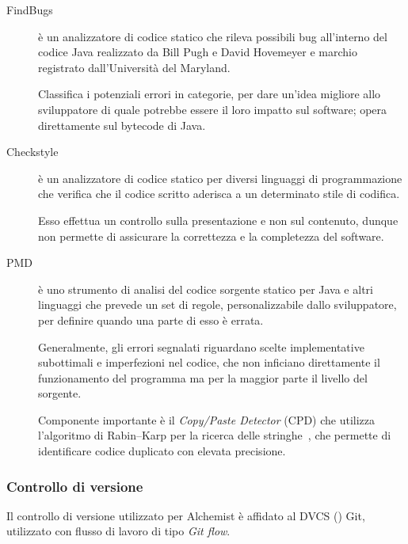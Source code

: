                \begin{description}
                    \item[FindBugs\footnotemark] è un analizzatore di codice statico  che rileva possibili bug all’interno del codice Java realizzato da Bill Pugh e David Hovemeyer e marchio registrato dall'Università del Maryland.

                    Classifica i potenziali errori in categorie, per dare un'idea migliore allo sviluppatore di quale potrebbe essere il loro impatto sul software; opera direttamente sul bytecode di Java.

                    \item[Checkstyle\footnotemark] è un analizzatore di codice statico  per diversi linguaggi di programmazione che verifica che il codice scritto aderisca a un determinato stile di codifica.

                    Esso effettua un controllo sulla presentazione e non sul contenuto, dunque non permette di assicurare la correttezza e la completezza del software.

                    \item[PMD\footnotemark] è uno strumento di analisi del codice sorgente statico per Java e altri linguaggi che prevede un set di regole, personalizzabile dallo sviluppatore, per definire quando una parte di esso è errata.

                    Generalmente, gli errori segnalati riguardano scelte implementative subottimali e imperfezioni nel codice, che non inficiano direttamente il funzionamento del programma ma per la maggior parte il livello del sorgente.

                    Componente importante è il \emph{Copy/Paste Detector} (CPD) che utilizza l'algoritmo di Rabin–Karp per la ricerca delle stringhe~\cite{RabinKarp}, che permette di identificare codice duplicato con elevata precisione.

                \end{description}

            \subsubsection{Controllo di versione}\label{subsub:hosting}
                Il controllo di versione utilizzato per Alchemist è affidato al DVCS () Git, utilizzato con flusso di lavoro di tipo \emph{Git flow}.

